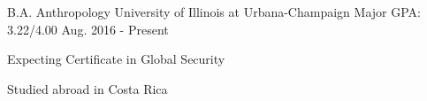 

\begin{cventries}

  \cventry
    {B.A. Anthropology} %
    {University of Illinois at Urbana-Champaign} %
    {Major GPA: 3.22/4{\tiny{.00}}} %
    {Aug. 2016 - Present} %
    {
      \begin{cvitems} %
        \item {Expecting Certificate in Global Security}
        \item {Studied abroad in Costa Rica}
      \end{cvitems}
    }

\end{cventries}
